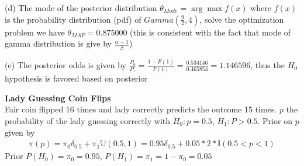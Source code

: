 \documentclass{homeworg}
\begin{document}
(d) The mode of the posterior distribution $\theta_{Mode}=\arg\max f(x)$ where $f(x)$ is the probability distribution (pdf) of $Gamma(\frac{9}{2},4)$, solve the optimization problem we have $\theta_{MAP}=0.875000$ (this is consistent with the fact that mode of gamma distribution is give by $\frac{\alpha-1}{\beta}$)

(e) The posterior odds is given by $\frac{P_0}{P_1}=\frac{1-F(1)}{F(1)}=\frac{0.534146}{0.465854}=1.146596$, thus the $H_0$ hypothesis is favored based on posterior


\exercise
\textbf{Lady Guessing Coin Flips}\\
Fair coin flipped 16 times and lady correctly predicts the outcome 15 times. $p$ the probability of the lady guessing correctly with $H_0: p=0.5$, $H_1: P>0.5$. Prior on $p$ given by
\begin{align*}
\pi(p)=\pi_0\delta_{0.5}+\pi_1\mathbb{U}(0.5,1)=0.95\delta_{0.5}+0.05*2*\mathbb{I}(0.5<p<1)
\end{align*}
Prior $P(H_0)=\pi_0=0.95$, $P(H_1)=\pi_1=1-\pi_0=0.05$
\end{document}
